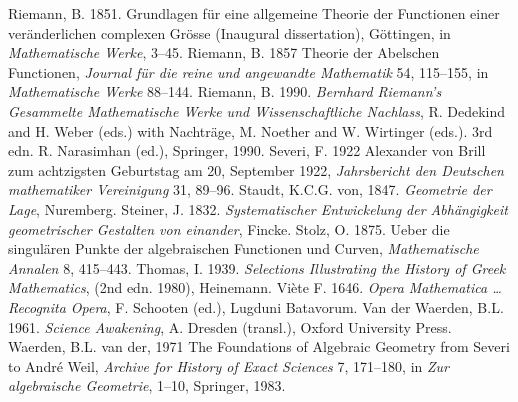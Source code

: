 \newline\indent Riemann, B. 1851.  Grundlagen f\"ur eine allgemeine Theorie der Functionen einer ver\"anderlichen complexen Gr\"osse (Inaugural dissertation), G\"ottingen, in \emph{Mathematische Werke}, 3--45.
 \newline\indent Riemann, B. 1857  Theorie der Abelschen Functionen, \emph{Journal f\"ur die reine und angewandte Mathematik}  54, 115--155, in \emph{Mathematische Werke} 88--144.
 \newline\indent  Riemann, B. 1990. \emph{Bernhard Riemann's Gesammelte Mathematische Werke und Wissenschaft\-liche Nachlass}, R. Dedekind and  H. Weber (eds.)  with Nach\-tr\"age, M. Noether and W. Wirtinger (eds.). 3rd edn. R. Narasimhan (ed.), Springer, 1990.
 \newline\indent Severi, F. 1922  Alexander von Brill zum achtzigsten Geburtstag am 20, September 1922, \emph{Jahrsbericht den Deutschen mathematiker Vereinigung} 31, 89--96.
  \newline\indent Staudt, K.C.G. von, 1847. \emph{Geometrie der Lage}, Nuremberg.
\newline\indent   Steiner, J. 1832. \emph{Systematischer Entwickelung der Abh\"angigkeit geometri\-scher Gestalten von einander}, Fincke.
 \newline\indent Stolz, O.  1875. Ueber die singul\"aren Punkte der algebraischen Functionen und Curven, \emph{Mathematische Annalen} 8, 415--443. 
\newline\indent Thomas, I. 1939. \emph{Selections Illustrating the History of Greek Mathematics}, (2nd edn. 1980), Heinemann.
 \newline\indent Vi\`ete  F. 1646.  \emph{Opera Mathematica \ldots Recognita Opera}, F.  Schooten (ed.), Lugduni Batavorum.
\newline\indent Van der Waerden, B.L. 1961. \emph{Science Awakening}, A. Dresden (transl.), Oxford University Press.
\newline\indent Waerden, B.L. van der, 1971  The Foundations of Algebraic Geometry from Severi to Andr{\'e} Weil, \emph{Archive for History of Exact Sciences} 7,  171--180, in  \emph{Zur algebraische Geometrie},  1--10, Springer, 1983.
 \normalsize
 
 
 
 
 
 







%
